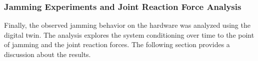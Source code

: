 

\subsubsection{Jamming Experiments and Joint Reaction Force Analysis}
Finally, the observed jamming behavior on the hardware was analyzed using the digital twin. The analysis explores the system conditioning over time to the point of jamming and the joint reaction forces. The following section provides a discussion about the results. 

